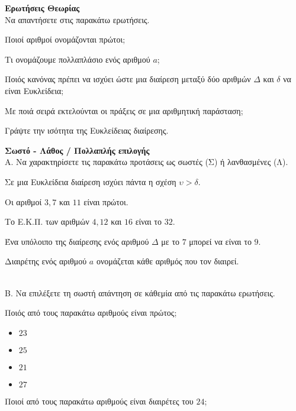\documentclass[ektypwsh]{diag-xelatex}
\begin{document}
\thewria
\begin{thema}
\item \textbf{Ερωτήσεις Θεωρίας}\\
Να απαντήσετε στις παρακάτω ερωτήσεις.
\begin{rlist}
\item Ποιοί αριθμοί ονομάζονται πρώτοι;
\item Τι ονομάζουμε πολλαπλάσιο ενός αριθμού $ a $;
\item Ποιός κανόνας πρέπει να ισχύει ώστε μια διαίρεση μεταξύ δύο αριθμών $ \varDelta $ και $ \delta $ να είναι Ευκλείδεια;
\item Με ποιά σειρά εκτελούνται οι πράξεις σε μια αριθμητική παράσταση;
\item Γράψτε την ισότητα της Ευκλείδειας διαίρεσης.
\end{rlist}
\item \textbf{Σωστό - Λάθος / Πολλαπλής επιλογής}\\
Α. Να χαρακτηρίσετε τις παρακάτω προτάσεις ως σωστές (Σ) ή λανθασμένες (Λ).
\begin{rlist}
\item Σε μια Ευκλείδεια διαίρεση ισχύει πάντα η σχέση $ \upsilon>\delta $.
\item Οι αριθμοί $ 3,7 $ και $ 11 $ είναι πρώτοι.
\item Το Ε.Κ.Π. των αριθμών $ 4,12 $ και $ 16 $ είναι το $ 32 $.
\item Ένα υπόλοιπο της διαίρεσης ενός αριθμού $ \varDelta $ με το $ 7 $ μπορεί να είναι το $ 9 $.
\item Διαιρέτης ενός αριθμού $ a $ ονομάζεται κάθε αριθμός που τον διαιρεί.
\end{rlist}\\
B. Να επιλέξετε τη σωστή απάντηση σε κάθεμία από τις παρακάτω ερωτήσεις.
\begin{rlist}
\item Ποιός από τους παρακάτω αριθμούς είναι πρώτος;
\begin{multicols}{4}
\begin{itemize}
\item $ 23 $
\item $ 25 $
\item $ 21 $
\item $ 27 $
\end{itemize}
\end{multicols}
\item Ποιοί από τους παρακάτω αριθμούς είναι διαιρέτες του $ 24 $;

\end{rlist}
\end{thema}
\end{document}
